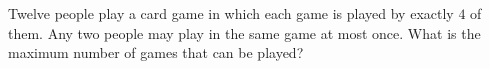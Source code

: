 Twelve people play a card game in which each game is played by exactly $4$ of them. Any two people may play in the same game at most once. What is the maximum number of games that can be played?
